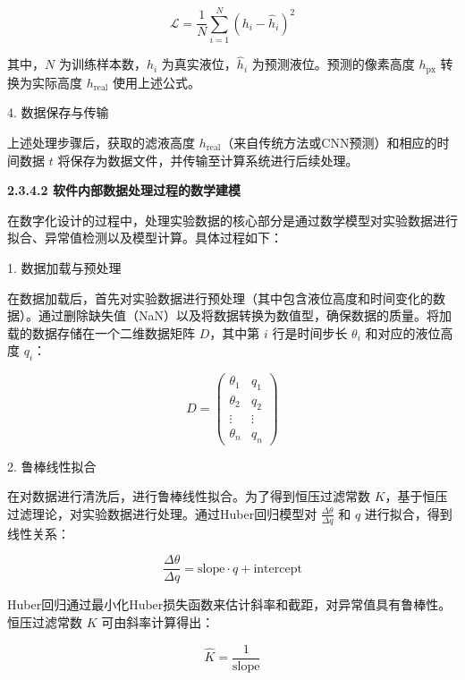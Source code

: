 \documentclass[UTF8,a4paper,fontset=none]{ctexart}
\newcommand{\wuhao}{\fontsize{10.5pt}{15pt}\selectfont}       %
\begin{document}
\begin{equation}
\mathcal{L} = \frac{1}{N} \sum_{i=1}^{N} (h_i - \hat{h}_i)^2
\end{equation}

其中，\( N \) 为训练样本数，\( h_i \) 为真实液位，\( \hat{h}_i \) 为预测液位。预测的像素高度 \( h_{\text{px}} \) 转换为实际高度 \( h_{\text{real}} \) 使用上述公式。

4. 数据保存与传输

上述处理步骤后，获取的滤液高度 \( h_{\text{real}} \)（来自传统方法或CNN预测）和相应的时间数据 \( t \) 将保存为数据文件，并传输至计算系统进行后续处理。

{\noindent \wuhao \rmfamily {} \textbf{2.3.4.2 \quad 软件内部数据处理过程的数学建模}}

在数字化设计的过程中，处理实验数据的核心部分是通过数学模型对实验数据进行拟合、异常值检测以及模型计算。具体过程如下：

1. 数据加载与预处理

在数据加载后，首先对实验数据进行预处理（其中包含液位高度和时间变化的数据）。通过删除缺失值（NaN）以及将数据转换为数值型，确保数据的质量。将加载的数据存储在一个二维数据矩阵 \( D \)，其中第 \( i \) 行是时间步长 \( \theta_i \) 和对应的液位高度 \( q_i \)：

\begin{equation}
D = \begin{pmatrix}
\theta_1 & q_1 \\
\theta_2 & q_2 \\
\vdots & \vdots \\
\theta_n & q_n
\end{pmatrix}
\end{equation}

2. 鲁棒线性拟合

在对数据进行清洗后，进行鲁棒线性拟合。为了得到恒压过滤常数 \( K \)，基于恒压过滤理论，对实验数据进行处理。通过Huber回归模型\textsuperscript{\cite{ref23}}对 \( \frac{\Delta \theta}{\Delta q} \) 和 \( q \) 进行拟合，得到线性关系：

\begin{equation}
\frac{\Delta \theta}{\Delta q} = \text{slope} \cdot q + \text{intercept}
\end{equation}

Huber回归通过最小化Huber损失函数来估计斜率和截距，对异常值具有鲁棒性。恒压过滤常数 \( K \) 可由斜率计算得出：

\begin{equation}
\hat{K} = \frac{1}{\text{slope}}
\end{equation}
\end{document}
